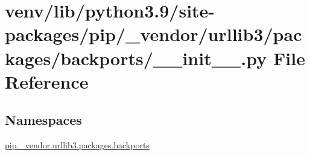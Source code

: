 \hypertarget{venv_2lib_2python3_89_2site-packages_2pip_2__vendor_2urllib3_2packages_2backports_2____init_____8py}{}\section{venv/lib/python3.9/site-\/packages/pip/\+\_\+vendor/urllib3/packages/backports/\+\_\+\+\_\+init\+\_\+\+\_\+.py File Reference}
\label{venv_2lib_2python3_89_2site-packages_2pip_2__vendor_2urllib3_2packages_2backports_2____init_____8py}
\subsection*{Namespaces}
\begin{DoxyCompactItemize}
\item 
 \hyperlink{namespacepip_1_1__vendor_1_1urllib3_1_1packages_1_1backports}{pip.\+\_\+vendor.\+urllib3.\+packages.\+backports}
\end{DoxyCompactItemize}

